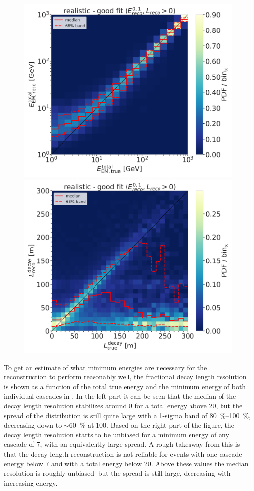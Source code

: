 \begin{figure}[h]
	\centering
    \includegraphics[width=0.49\linewidth]{figures/model_independent_simulation/results/realistic/2d_hists/194603_reco_total_energy_vs_true_total_energy_goodfit_step_contours.png}
    \includegraphics[width=0.49\linewidth]{figures/model_independent_simulation/results/realistic/2d_hists/194603_reco_decay_length_vs_true_decay_length_goodfit_step_contours.png}
    \caption[]{}
\end{figure}

To get an estimate of what minimum energies are necessary for the reconstruction to perform reasonably well, the fractional decay length resolution is shown as a function of the total true energy and the minimum energy of both individual cascades in . In the left part it can be seen that the median of the decay length resolution stabilizes around 0 for a total energy above \SI{20}{\gev}, but the spread of the distribution is still quite large with a 1-sigma band of \SIrange{80}{100}{\percent}, decreasing down to $\sim$\SI{60}{\percent} at \SI{100}{\gev}. Based on the right part of the figure, the decay length resolution starts to be unbiased for a minimum energy of any cascade of \SI{7}{\gev}, with an equivalently large spread. A rough takeaway from this is that the decay length reconstruction is not reliable for events with one cascade energy below \SI{7}{\gev} and with a total energy below \SI{20}{\gev}. Above these values the median resolution is roughly unbiased, but the spread is still large, decreasing with increasing energy.

